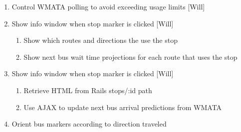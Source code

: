 \documentclass[12pt]{report}
\begin{document}
\begin{description}
\begin{enumerate}
    \item Control WMATA polling to avoid exceeding usage limits [Will]
    \item Show info window when stop marker is clicked [Will]
      \begin{enumerate}
        \item Show which routes and directions the use the stop
        \item Show next bus wait time projections for each route that uses the stop
      \end{enumerate}
    \item Show info window when stop marker is clicked [Will]
    \begin{enumerate}
      \item Retrieve HTML from Rails stops/:id path
      \item Use AJAX to update next bus arrival predictions from WMATA
    \end{enumerate}
    \item Orient bus markers according to direction traveled
  \end{enumerate}
\end{description}

\printbibliography
\end{document}
